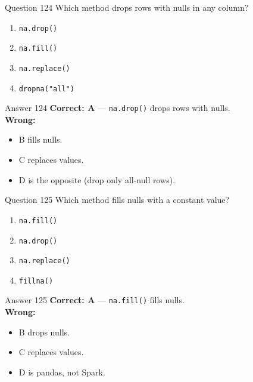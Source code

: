 \documentclass[aspectratio=169,11pt]{beamer}
\begin{document}
	\begin{frame}{Question 124}
		Which method drops rows with nulls in any column?
		\begin{enumerate}[label=\Alph*.]
			\item \texttt{na.drop()}
			\item \texttt{na.fill()}
			\item \texttt{na.replace()}
			\item \texttt{dropna("all")}
		\end{enumerate}
	\end{frame}
	\begin{frame}{Answer 124}
		\textbf{Correct: A} --- \texttt{na.drop()} drops rows with nulls.\\
		\vspace{0.5em}
		\textbf{Wrong:}
		\begin{itemize}
			\item B fills nulls.
			\item C replaces values.
			\item D is the opposite (drop only all-null rows).
		\end{itemize}
	\end{frame}
	
	\begin{frame}{Question 125}
		Which method fills nulls with a constant value?
		\begin{enumerate}[label=\Alph*.]
			\item \texttt{na.fill()}
			\item \texttt{na.drop()}
			\item \texttt{na.replace()}
			\item \texttt{fillna()}
		\end{enumerate}
	\end{frame}
	\begin{frame}{Answer 125}
		\textbf{Correct: A} --- \texttt{na.fill()} fills nulls.\\
		\vspace{0.5em}
		\textbf{Wrong:}
		\begin{itemize}
			\item B drops nulls.
			\item C replaces values.
			\item D is pandas, not Spark.
		\end{itemize}
	\end{frame}
	
\end{document}
